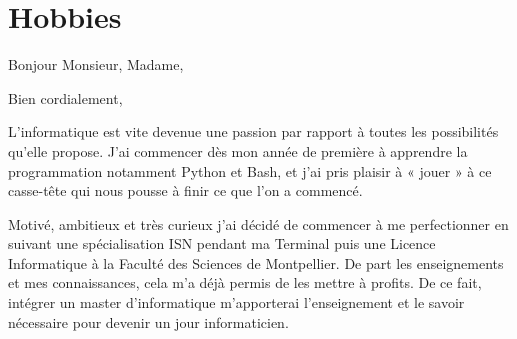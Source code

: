 \documentclass[11pt,a4paper,sans]{moderncv}
\newcommand{\tab}{\hspace{10mm}} %
\begin{document}
\section{Hobbies}

\clearpage


\date{\today}
\opening{\tab Bonjour Monsieur, Madame,}
\closing{\tab Bien cordialement,}

\makelettertitle

\tab L’informatique est vite devenue une passion par rapport  à toutes les possibilités qu’elle propose. J’ai commencer dès mon année de première à apprendre la programmation notamment Python et Bash, et j’ai pris plaisir à « jouer » à ce casse-tête qui nous pousse à finir ce que l’on a commencé. \par \vspace{5mm}

\tab Motivé, ambitieux et très curieux j’ai décidé de commencer à me perfectionner en suivant une spécialisation ISN pendant ma Terminal puis une Licence Informatique à la Faculté des Sciences de Montpellier. De part les enseignements et mes connaissances, cela m’a déjà permis de les mettre à profits.
De ce fait, intégrer un master d'informatique m’apporterai l’enseignement et le savoir nécessaire pour devenir un jour informaticien.

\makeletterclosing
\end{document}
